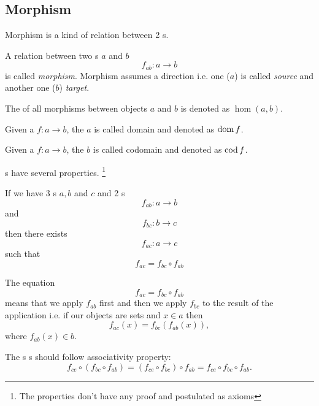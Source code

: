 \subsection{Morphism}
Morphism is a kind of relation between 2 s. 
\begin{definition}[Morphism]
  \label{def:morphism}
  A relation between two s $a$ and $b$ 
  \[
  f_{ab}: a \rightarrow b
  \]
  is called
  \textit{morphism}. Morphism assumes a direction i.e. one 
  ($a$) is called \textit{source} and another one ($b$)
  \textit{target}.

  The  of all morphisms between objects $a$ and $b$
  is denoted as $\hom\left(a, b\right)$.
\end{definition}

\begin{definition}[Domain]
  \label{def:domain}
  Given a  $f: a \to b$, the
   $a$ is called domain and denoted as $\operatorname{dom} f$.
\end{definition}

\begin{definition}[Codomain]
  \label{def:codomain}
  Given a  $f: a \to b$, the
   $b$ is called codomain and denoted as $\operatorname{cod} f$.
\end{definition}

s have several properties. \footnote{The
  properties don't have any proof and postulated as axioms}
\begin{axiom}[Composition]
  \label{axm:composition}
  If we have 3 s $a, b$ and $c$ and 2
  s 
  \[
  f_{ab} : a \rightarrow b
  \]
  and 
  \[
  f_{bc} : b \rightarrow c
  \]
  then there exists  
  \[
  f_{ac} : a \rightarrow c
  \]
  such that
  \[
  f_{ac} = f_{bc} \circ f_{ab}
  \]
\end{axiom}

\begin{remark}[Composition]
  \label{rem:composition}
  The equation
  \[
  f_{ac} = f_{bc} \circ f_{ab}
  \]
  means that we apply $f_{ab}$ first and then we apply $f_{bc}$ to the
  result of the application i.e. if our objects are sets and $x \in a$
  then 
  \[
  f_{ac} ( x ) = f_{bc} ( f_{ab} ( x ) ),
  \]
  where $f_{ab} ( x ) \in b$.
\end{remark}

\begin{axiom}[Associativity]
  \label{axm:associativity}
  The s s should
  follow associativity property:
  \[
  f_{ce} \circ (f_{bc} \circ f_{ab}) = (f_{ce} \circ f_{bc}) \circ
  f_{ab} = f_{ce} \circ f_{bc} \circ f_{ab}.
  \]
\end{axiom}

